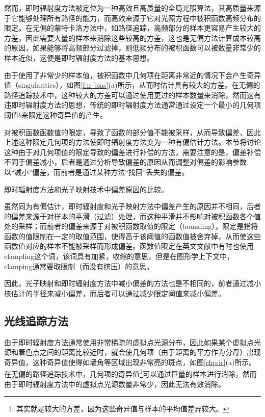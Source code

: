 然而，即时辐射度方法被定位为一种高效且高质量的全局光照算法，其高质量来源于它能够处理所有路径的能力，而高效来源于它对光照方程中被积函数高频分布的限定。在无偏的蒙特卡洛方法中，如路径追踪，高频部分的样本更容易产生较大的方差，因此需要大量的样本来消除这些较高的方差，这也是无偏方法计算成本较高的原因，如果能够将高频部分过滤掉，则低频分布的被积函数可以被数量非常少的样本近似，这便是即时辐射度方法的基本思想。

由于使用了非常少的样本值，被积函数中几何项在距离非常近的情况下会产生奇异值（singularities），如图\ref{f:ir-bias}(a)所示，从而时估计具有较大的方差。在无偏的路径追踪技术中，这种较大的方差可以通过使用更过的样本数量来消除，然而这有违即时辐射度方法的思想，传统的即时辐射度方法\cite{a:InstantRadiosity}通常通过设定一个最小的几何项阈值$b$来限定这种奇异值的产生。

对被积函数函数值的限定，导致了函数的部分值不能被采样，从而导致偏差，因此上述这种限定几何项的方法使即时辐射度方法变为一种有偏估计方法。本节将讨论这种由于对几何项值的限定导致的偏差进行补偿的方法，需要注意的是，偏差补偿不同于偏差减小，后者是通过分析导致偏差的原因从而调整对偏差的影响参数以“减小”偏差，而前者是通过某种方法“找回”丢失的偏差。

\begin{myshaded}
	\indent 即时辐射度方法和光子映射技术中偏差原因的比较。
	
	\indent 虽然同为有偏估计，即时辐射度和光子映射方法中偏差产生的原因并不相同，后者的偏差来源于对样本的平滑（过滤）处理，而这种平滑并不影响对被积函数各个值处的采样；而前者的偏差来源于对被积函数取值的限定（bounding），限定是指将函数的值限制在一定的取值范围，使得高于该阈值的函数值被舍弃掉，从而使这些函数值对应的样本不能被采样而形成偏差。函数值限定在英文文献中有时也使用clampling这个词，该词具有加紧，收缩的意思，但是在图形学上下文中，clamping通常要取限制（而没有挤压）的意思。
	
	\indent 因此，光子映射和即时辐射度方法中减小偏差的方法也是不相同的，前者通过减小核估计的半径来减小偏差，而后者可以通过减少限定阈值来减小偏差。
\end{myshaded}





\subsection{光线追踪方法}
由于即时辐射度方法通常使用非常稀疏的虚拟点光源分布，因此如果某个虚拟点光源和着色点之间的距离比较近时，就会使几何项（由于距离的平方作为分母）出现奇异值，这种奇异值使得如墙角等区域出现非常亮的斑点，如图\ref{chp:ir}(a)所示。在无偏的路径追踪技术中，几何项的奇异值\footnote{其实就是较大的方差，因为这些奇异值与样本的平均值差异较大。}可以通过巨量的样本进行消除，然而由于即时辐射度方法中的虚拟点光源数量非常少，因此无法有效消除。

